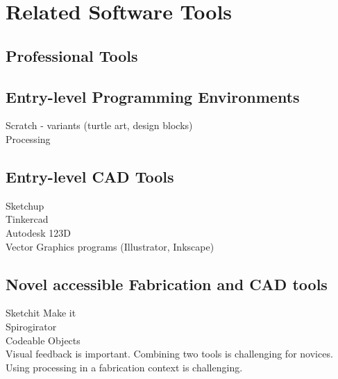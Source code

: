 \documentclass{sigchi}
\begin{document}
\section{Related Software Tools}
\subsection{Professional Tools}
\subsection{Entry-level Programming Environments}
Scratch - variants (turtle art, design blocks) \\
Processing \\
\subsection{Entry-level CAD Tools}
Sketchup\\
Tinkercad\\
Autodesk 123D\\
Vector Graphics programs (Illustrator, Inkscape)\\
\subsection{Novel accessible Fabrication and CAD tools}
Sketchit Make it\\
Spirogirator\\
Codeable Objects\\

Visual feedback is important. Combining two tools is challenging for novices. Using processing in a fabrication context is challenging.
\end{document}
